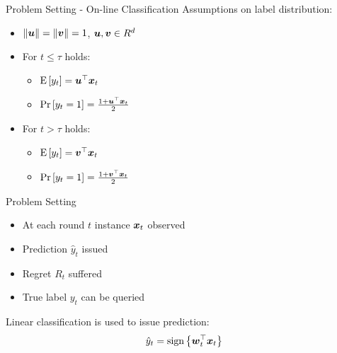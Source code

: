 \documentclass{beamer}
\begin{document}
\begin{frame}{Problem Setting - On-line Classification}
Assumptions on label distribution:\newline
\begin{itemize}
\item $\|{\boldsymbol{u}}\|=\|{\boldsymbol{v}}\|=1$, ${\boldsymbol{u}},{\boldsymbol{v}}\in R^d$ \newline
\item For $t\leq\tau$ holds:\newline
\begin{itemize}
\item  ${\rm E}\left[{y_t}\right]={{\boldsymbol{u}}}^{\top}{\boldsymbol{x}}_{t}$\newline
\item  ${\rm Pr}\left[{y_t=1}\right]=\frac{1+{{\boldsymbol{u}}}^{\top}{\boldsymbol{x}}_{t}}{2}$\newline
\end{itemize}
\item For $t>\tau$ holds:\newline
\begin{itemize}
\item ${\rm E}\left[{y_t}\right]={{\boldsymbol{v}}}^{\top}{\boldsymbol{x}}_{t}$\newline
\item ${\rm Pr}\left[{y_t=1}\right]=\frac{1+{{\boldsymbol{v}}}^{\top}{\boldsymbol{x}}_{t}}{2}$\newline
\end{itemize}
\end{itemize}
\end{frame}



\begin{frame}{Problem Setting}
\begin{itemize}
\item At each round $t$ instance ${\boldsymbol{x}}_{t}$ observed\newline
\item Prediction $\hat{y}_t$ issued\newline
\item Regret $R_t$ suffered\newline
\item True label $y_t$ can be queried \newline
\end{itemize}
Linear classification is used to issue prediction:
\begin{equation*}
\hat{y}_t={\rm sign}\left\{{{\boldsymbol{w}}}^{\top}_{t}{\boldsymbol{x}}_{t}\right\}
\end{equation*}
\end{frame}
\end{document}
